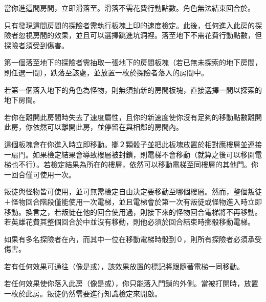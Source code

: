 \begin{RuleBox}{}%
  當你進這間房間，立即滑落至。滑落不需花費行動點數。角色無法結束回合於。
\end{RuleBox}

\begin{RuleBox}{}%
  只有發現這間房間的探險者需執行板塊上印的速度檢定。此後，任何進入此房的探險者忽視房間的效果，並且可以選擇跳進坑洞裡。落至地下不需花費行動點數，但探險者須受到傷害。\par
  第一個落至地下的探險者需抽取一張地下的房間板塊（若已無未探索的地下房間，則任選一間），跌落至該處，並放置一枚於探險者落入的房間中。\par
  若第一個落入地下的角色為怪物，則無須抽新的房間板塊，直接選擇一間以探索的地下房間。
\end{RuleBox}

\begin{RuleBox}{}%
  若你在離開此房間時失去了速度屬性，且你的新速度使你沒有足夠的移動點數離開此房，你依然可以離開此房，並停留在與相鄰的房間內。
\end{RuleBox}

\begin{RuleBox}{}%
  這個板塊會在你進入時立即移動。擲２顆骰子並把此板塊放置於相對應樓層並連接一扇門。如果檢定結果會導致樓層被封鎖，則電梯不會移動（就算之後可以移開電梯也不行）。若檢定結果為所在的樓層，依然可以移動電梯至同樓層的其他門。你一回合僅可使用一次。\par
  叛徒與怪物皆可使用，並可無需檢定自由決定要移動至哪個樓層。然而，整個叛徒＋怪物回合階段僅能使用一次電梯，並且電梯會於第一次有叛徒或怪物進入時立即移動。換言之，若叛徒在他的回合使用過，則接下來的怪物回合電梯將不再移動。若英雄花費其整個回合於中並沒有移動，則他必須於回合結束時擲骰移動電梯。\par
  如果有多名探險者在內，而其中一位在移動電梯時骰到０，則所有探險者必須承受傷害。\par
  若有任何效果可通往（像是或），該效果放置的標記將跟隨著電梯一同移動。
\end{RuleBox}

\begin{RuleBox}{}%
  若任何效果使你落入此房（像是或），你只能落入門鎖的外側。當被打開時，放置一枚於此房。叛徒仍然需要進行知識檢定來開啟。
\end{RuleBox}

